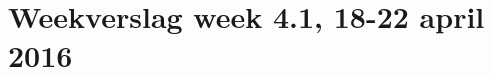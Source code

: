 \documentclass[11pt,a4paper]{article}
\begin{document}
\thispagestyle{empty}

\section*{Weekverslag week 4.1, 18-22 april 2016}





\end{document}
